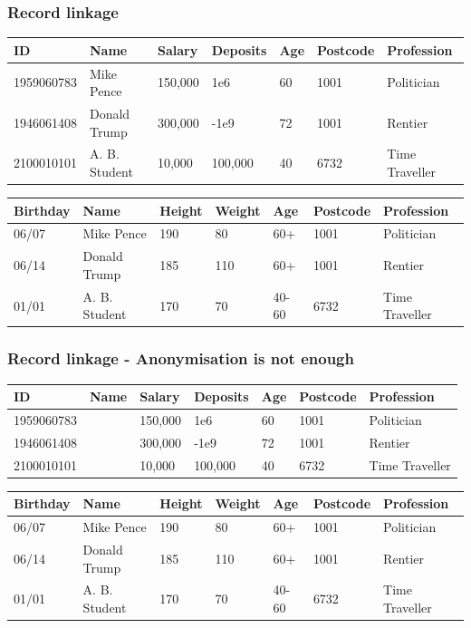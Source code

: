 \begin{frame}
  \frametitle{Record linkage}

  \begin{example}
    \begin{tabular}{l|l|l|l|l|l|l}
      ID & Name &  Salary & Deposits & Age & Postcode & Profession\\
      \hline
      1959060783 & Mike Pence & 150,000 & 1e6 & 60 & 1001 & Politician\\
      1946061408 & Donald Trump & 300,000 & -1e9 & 72 & 1001 & Rentier\\
      2100010101 & A. B. Student & 10,000 & 100,000 & 40 & 6732 & Time Traveller
    \end{tabular}
  \end{example}
  
  \begin{example}
    \begin{tabular}{l|l|l|l|l|l|l}
      Birthday & Name & Height  & Weight & Age & Postcode & Profession\\
      \hline
      06/07 & Mike Pence & 190 & 80 & 60+ & 1001 & Politician\\
      06/14 & Donald Trump & 185 & 110 & 60+ & 1001 & Rentier\\
      01/01 & A. B. Student & 170 & 70 & 40-60 & 6732 & Time Traveller
    \end{tabular}
  \end{example}
\end{frame}

\begin{frame}
  \frametitle{Record linkage - Anonymisation is not enough}
  \begin{example}
    \begin{tabular}{l|l|l|l|l|l|l}
      ID & Name &  Salary & Deposits & Age & Postcode & Profession\\
      \hline
      1959060783 &  & 150,000 & 1e6 & 60 & 1001 & Politician\\
      \alert{1946061408} &  & 300,000 & -1e9 & 72 & \alert{1001} & Rentier\\
      2100010101 &  & 10,000 & 100,000 & 40 & 6732 & Time Traveller
    \end{tabular}
  \end{example}
  
  \begin{example}
    \begin{tabular}{l|l|l|l|l|l|l}
      Birthday & Name & Height  & Weight & Age & Postcode & Profession\\
      \hline
      06/07 & Mike Pence & 190 & 80 & 60+ & 1001 & Politician\\
      \alert{06/14} & Donald Trump & 185 & 110 & 60+ & \alert{1001} & Rentier\\
      01/01 & A. B. Student & 170 & 70 & 40-60 & 6732 & Time Traveller
    \end{tabular}
  \end{example}
\end{frame}


